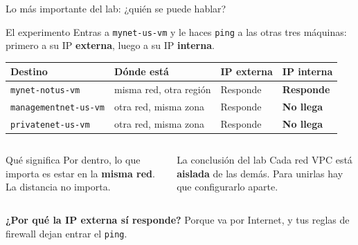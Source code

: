 \documentclass[aspectratio=169,10pt,c]{beamer}
\begin{document}
\begin{frame}{Lo más importante del lab: ¿quién se puede hablar?}
\begin{block}{El experimento}
\small Entras a \texttt{mynet-us-vm} y le haces \texttt{ping} a las otras tres máquinas: primero a su IP \textbf{externa}, luego a su IP \textbf{interna}.
\end{block}
\renewcommand{\arraystretch}{1.3}
\centering\small
\begin{tabular}{@{}p{4.3cm}p{3.6cm}p{2.3cm}p{2.3cm}@{}}
\toprule
\textbf{Destino} & \textbf{Dónde está} & \textbf{IP externa} & \textbf{IP interna}\\
\midrule
\texttt{mynet-notus-vm} & misma red, otra región & Responde & \textbf{Responde}\\
\texttt{managementnet-us-vm} & otra red, misma zona & Responde & \textbf{No llega}\\
\texttt{privatenet-us-vm} & otra red, misma zona & Responde & \textbf{No llega}\\
\bottomrule
\end{tabular}
\par\vspace{2mm}
\begin{columns}[T,onlytextwidth]
\begin{exampleblock}{Qué significa}
\small Por dentro, lo que importa es estar en la \textbf{misma red}. La distancia no importa.
\end{exampleblock}
\begin{alertblock}{La conclusión del lab}
\small Cada red VPC está \textbf{aislada} de las demás. Para unirlas hay que configurarlo aparte.
\end{alertblock}
\end{columns}
\par\vspace{1mm}
{\raggedright\small \textbf{¿Por qué la IP externa sí responde?} Porque va por Internet, y tus reglas de firewall dejan entrar el \texttt{ping}.\par}
\end{frame}
\end{document}
